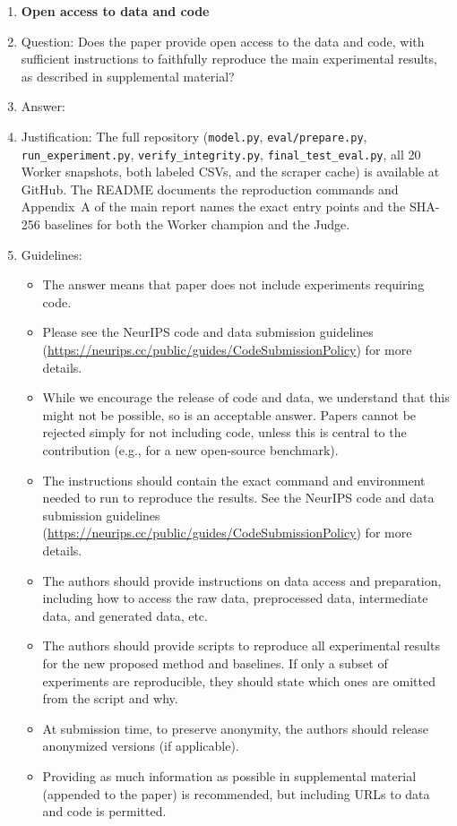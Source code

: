 \documentclass{article}
\begin{document}
\begin{enumerate}
\item {\bf Open access to data and code}
    \item[] Question: Does the paper provide open access to the data and code, with sufficient instructions to faithfully reproduce the main experimental results, as described in supplemental material?
    \item[] Answer: \answerYes{}
    \item[] Justification: The full repository (\texttt{model.py}, \texttt{eval/prepare.py}, \texttt{run\_experiment.py}, \texttt{verify\_integrity.py}, \texttt{final\_test\_eval.py}, all 20 Worker snapshots, both labeled CSVs, and the scraper cache) is available at GitHub. The README documents the reproduction commands and Appendix~A of the main report names the exact entry points and the SHA-256 baselines for both the Worker champion and the Judge.
    \item[] Guidelines:
    \begin{itemize}
        \item The answer \answerNA{} means that paper does not include experiments requiring code.
        \item Please see the NeurIPS code and data submission guidelines (\url{https://neurips.cc/public/guides/CodeSubmissionPolicy}) for more details.
        \item While we encourage the release of code and data, we understand that this might not be possible, so \answerNo{} is an acceptable answer. Papers cannot be rejected simply for not including code, unless this is central to the contribution (e.g., for a new open-source benchmark).
        \item The instructions should contain the exact command and environment needed to run to reproduce the results. See the NeurIPS code and data submission guidelines (\url{https://neurips.cc/public/guides/CodeSubmissionPolicy}) for more details.
        \item The authors should provide instructions on data access and preparation, including how to access the raw data, preprocessed data, intermediate data, and generated data, etc.
        \item The authors should provide scripts to reproduce all experimental results for the new proposed method and baselines. If only a subset of experiments are reproducible, they should state which ones are omitted from the script and why.
        \item At submission time, to preserve anonymity, the authors should release anonymized versions (if applicable).
        \item Providing as much information as possible in supplemental material (appended to the paper) is recommended, but including URLs to data and code is permitted.
    \end{itemize}



\end{enumerate}
\end{document}
